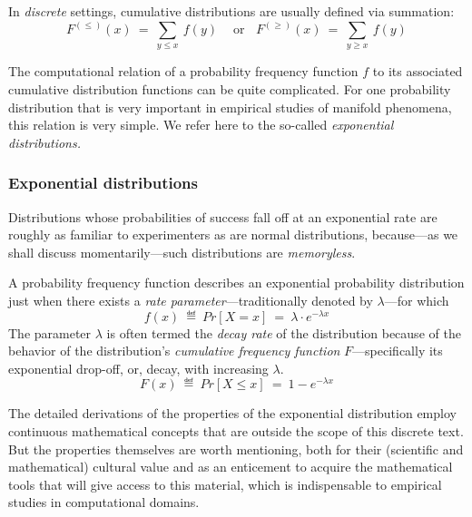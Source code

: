 In {\em discrete} settings, cumulative distributions are usually defined via summation:
\[ F^{(\leq)}(x) \ = \ \sum_{y \leq x} \ f(y)  \ \ \ \ \mbox{ or} \ \ \ \ F^{(\geq)}(x) \ = \ \sum_{y \geq x} \ f(y) \]

\bigskip

The computational relation of a probability frequency function $f$ to its associated cumulative distribution functions can be quite complicated.  For one probability distribution that is very important in empirical studies of manifold phenomena, this relation is very simple.  We refer here to the so-called {\em exponential distributions.}



\subsubsection{Exponential distributions} 
\label{sec:exponential-distr}

Distributions whose probabilities of success fall off at an exponential rate are roughly as familiar to experimenters as are normal distributions, because---as we shall discuss momentarily---such distributions are {\em memoryless}.

\medskip

A probability frequency function describes an exponential probability distribution just when there exists a {\em rate parameter}---traditionally denoted by $\lambda$---for which
\[ f(x) \ \eqdef \ Pr[X=x] \ = \ \lambda \cdot e^{-\lambda x} \]
The parameter $\lambda$ is often termed the {\em decay rate} of the distribution because of the behavior of the distribution's {\em cumulative frequency function} $F$---specifically its exponential drop-off, or, decay, with increasing $\lambda$.
\[ F(x) \ \eqdef \ Pr[X \leq x] \ = \ 1 - e^{-\lambda x} \]

 
 

\medskip

The detailed derivations of the properties of the exponential distribution employ continuous mathematical concepts that are outside the scope of this discrete text.  But the properties themselves are worth mentioning, both for their (scientific and mathematical) cultural value and as an enticement to acquire the mathematical tools that will give access to this material, which is indispensable to empirical studies in computational domains.


